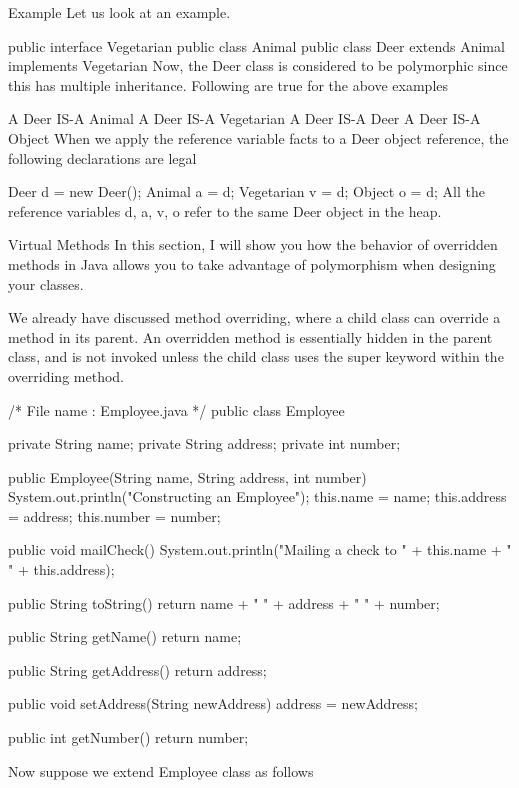 Example
Let us look at an example.

public interface Vegetarian{}
public class Animal{}
public class Deer extends Animal implements Vegetarian{}
Now, the Deer class is considered to be polymorphic since this has multiple inheritance. Following are true for the above examples

A Deer IS-A Animal
A Deer IS-A Vegetarian
A Deer IS-A Deer
A Deer IS-A Object
When we apply the reference variable facts to a Deer object reference, the following declarations are legal

Deer d = new Deer();
Animal a = d;
Vegetarian v = d;
Object o = d;
All the reference variables d, a, v, o refer to the same Deer object in the heap.

Virtual Methods
In this section, I will show you how the behavior of overridden methods in Java allows you to take advantage of polymorphism when designing your classes.

We already have discussed method overriding, where a child class can override a method in its parent. An overridden method is essentially hidden in the parent class, and is not invoked unless the child class uses the super keyword within the overriding method.

/* File name : Employee.java */
public class Employee {
   private String name;
   private String address;
   private int number;

   public Employee(String name, String address, int number) {
      System.out.println("Constructing an Employee");
      this.name = name;
      this.address = address;
      this.number = number;
   }

   public void mailCheck() {
      System.out.println("Mailing a check to " + this.name + " " + this.address);
   }

   public String toString() {
      return name + " " + address + " " + number;
   }

   public String getName() {
      return name;
   }

   public String getAddress() {
      return address;
   }

   public void setAddress(String newAddress) {
      address = newAddress;
   }

   public int getNumber() {
      return number;
   }
}
Now suppose we extend Employee class as follows

